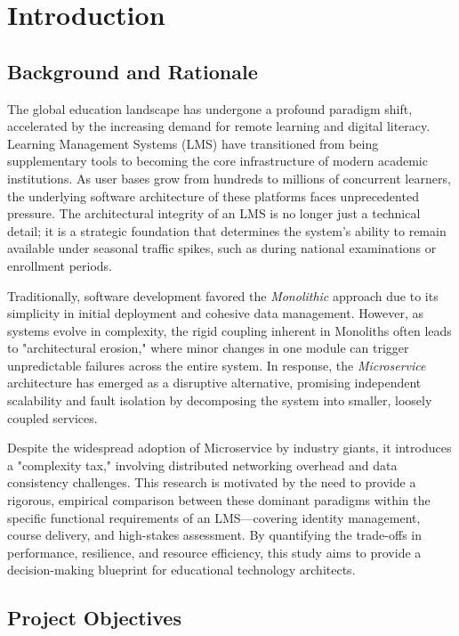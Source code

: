 \chapter{Introduction}

\section{Background and Rationale}

The global education landscape has undergone a profound paradigm shift, accelerated by the increasing demand for remote learning and digital literacy. Learning Management Systems (LMS) have transitioned from being supplementary tools to becoming the core infrastructure of modern academic institutions. As user bases grow from hundreds to millions of concurrent learners, the underlying software architecture of these platforms faces unprecedented pressure. The architectural integrity of an LMS is no longer just a technical detail; it is a strategic foundation that determines the system's ability to remain available under seasonal traffic spikes, such as during national examinations or enrollment periods.

Traditionally, software development favored the \textit{Monolithic} approach due to its simplicity in initial deployment and cohesive data management. However, as systems evolve in complexity, the rigid coupling inherent in Monoliths often leads to "architectural erosion," where minor changes in one module can trigger unpredictable failures across the entire system. In response, the \textit{Microservice} architecture has emerged as a disruptive alternative, promising independent scalability and fault isolation by decomposing the system into smaller, loosely coupled services. 

Despite the widespread adoption of Microservice by industry giants, it introduces a "complexity tax," involving distributed networking overhead and data consistency challenges. This research is motivated by the need to provide a rigorous, empirical comparison between these dominant paradigms within the specific functional requirements of an LMS—covering identity management, course delivery, and high-stakes assessment. By quantifying the trade-offs in performance, resilience, and resource efficiency, this study aims to provide a decision-making blueprint for educational technology architects.

\section{Project Objectives}

